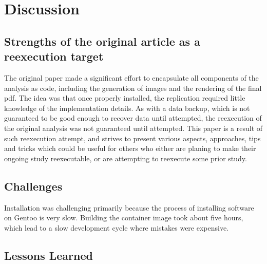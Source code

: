 \section{Discussion}


\subsection{Strengths of the original article as a reexecution target}
The original paper made a significant effort to encapsulate all
components of the analysis as code, including the generation of images
and the rendering of the final pdf. The idea was that once properly installed, the
replication required little knowledge of the implementation details.
As with a data backup, which is not guaranteed to be good enough to recover
data until attempted, the reexecution of the original analysis was not guaranteed
until attempted.
This paper is a result of such reexecution attempt, and strives to present various
aspects, approaches, tips and tricks which could be useful for others who either are
planing to make their ongoing study reexecutable, or are attempting to reexecute
some prior study.

\subsection{Challenges}
Installation was challenging primarily because the process of installing
software on Gentoo is very slow. Building the container image took
about five hours, which lead to a slow development cycle where mistakes
were expensive.




\subsection{Lessons Learned}

